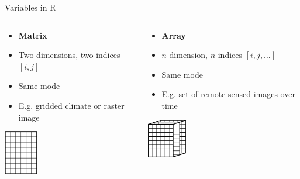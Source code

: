 \documentclass[aspectratio=169]{beamer}\usepackage[]{graphicx}\usepackage[]{color}
\begin{document}
\begin{frame}{Variables in R}
\begin{columns}
  \begin{column}{0.50\textwidth}
		\begin{itemize}
  		\item \textbf{Matrix}
		  \item Two dimensions, two indices $[i,j]$
		  \item Same mode
		  \item E.g. gridded climate or raster image
		\end{itemize}
		\begin{center}
      \includegraphics[width=0.25\textwidth]{./images/2d_matrix.png}
		\end{center}
	\end{column}
	\begin{column}{0.50\textwidth}
		\begin{itemize}
  		\item \textbf{Array}
		  \item $n$ dimension, $n$ indices $[i,j,\ldots]$
		  \item Same mode
		  \item E.g. set of remote sensed images over time
		\end{itemize}
		\begin{center}
			\includegraphics[width=0.25\textwidth]{./images/3d_array.png}
		\end{center}
	\end{column}
\end{columns}
\end{frame}
\end{document}

